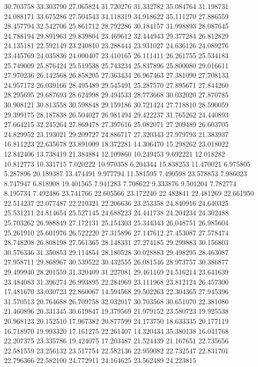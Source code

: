 30.703758
33.303790
27.065824
31.720276
31.332782
35.084764
31.198731
24.088171
33.675286
27.504543
34.118319
34.918622
35.111270
27.886559
28.457794
32.542706
25.861712
28.792286
30.184157
31.998893
28.087645
24.788194
29.891963
29.839804
23.469612
32.444943
29.377284
26.812829
24.135181
22.592149
23.240810
23.288444
23.931027
24.636126
24.089276
23.445769
24.035836
24.000407
23.410165
26.111411
26.261755
25.534183
25.749009
25.876424
25.519538
25.743234
25.837896
25.800080
29.016611
27.970236
26.142568
26.858205
27.363434
26.967463
27.381090
27.708133
24.957172
26.039166
28.495489
29.545491
25.287570
27.895671
27.844260
28.295695
29.687693
28.624998
29.494533
28.773668
30.032020
27.870785
30.908121
30.813558
30.598848
29.159186
30.721424
27.718810
28.590059
29.399175
28.187838
26.504027
26.981494
29.422237
31.765262
24.440893
27.664215
32.245264
27.869478
27.397616
25.082071
27.209489
26.603705
24.829952
23.193021
29.209727
24.886717
27.320343
27.979793
21.383937
16.811223
22.635678
23.891009
18.372281
14.306470
15.298262
23.018022
12.842406
13.738419
21.384884
12.109860
10.249453
9.692221
12.018282
10.812773
10.331715
7.020222
10.970358
6.204344
15.838253
11.470021
6.975805
5.287896
20.189387
13.474491
9.977794
11.581595
7.490598
23.578853
7.986023
8.747947
6.818908
19.401565
7.941283
7.708622
9.333876
9.501204
7.782774
8.195734
7.492486
23.741766
22.605566
23.172240
22.482841
22.481269
22.661950
22.514237
22.077487
22.210321
22.206636
23.253358
24.840916
24.640325
25.531211
24.814654
25.527145
24.688223
24.441738
24.204234
24.302488
25.703262
26.988849
27.172131
25.154303
25.344343
26.048751
26.985604
25.261910
25.601976
26.522220
27.315896
27.147612
27.453087
27.578474
28.748208
26.808198
27.561365
28.148331
27.274185
29.299883
30.156803
30.576336
31.350853
29.114854
28.180528
30.028883
29.498295
28.463087
27.958711
29.868967
30.539522
30.432555
26.081546
28.973757
30.386877
29.499940
28.201559
31.320409
31.227081
29.461169
24.516214
23.641639
23.484083
31.396274
26.993895
22.284969
23.111968
23.812124
26.457300
17.481670
33.030723
22.860067
14.594568
29.502263
22.304365
27.945396
31.570513
20.764688
26.709758
32.032017
30.703568
30.651070
22.381080
21.460896
20.331345
30.619847
19.379569
21.979152
23.580723
19.925538
20.968123
20.152510
17.967382
20.877599
24.173750
18.633335
20.177119
16.718970
19.993320
17.161275
22.261407
14.320434
35.380138
16.041768
22.207375
23.335786
19.424075
17.203487
21.524439
21.167651
22.735656
22.581559
23.256132
23.517754
22.582136
22.959082
22.732547
22.831701
22.796366
22.582100
24.772911
24.164625
23.562489
24.223815
